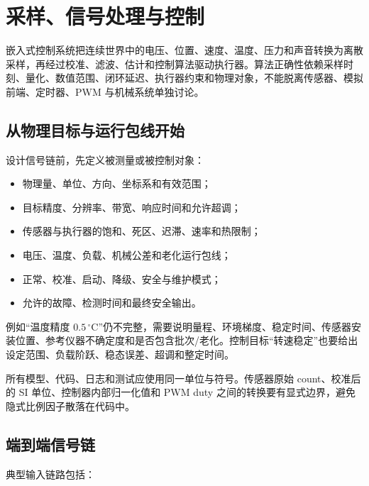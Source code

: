 \chapter{采样、信号处理与控制}
\label{chap:sampling-control-dsp}

嵌入式控制系统把连续世界中的电压、位置、速度、温度、压力和声音转换为离散采样，再经过校准、滤波、估计和控制算法驱动执行器。算法正确性依赖采样时刻、量化、数值范围、闭环延迟、执行器约束和物理对象，不能脱离传感器、模拟前端、定时器、PWM 与机械系统单独讨论。

\section{从物理目标与运行包线开始}

设计信号链前，先定义被测量或被控制对象：

\begin{itemize}
  \item 物理量、单位、方向、坐标系和有效范围；
  \item 目标精度、分辨率、带宽、响应时间和允许超调；
  \item 传感器与执行器的饱和、死区、迟滞、速率和热限制；
  \item 电压、温度、负载、机械公差和老化运行包线；
  \item 正常、校准、启动、降级、安全与维护模式；
  \item 允许的故障、检测时间和最终安全输出。
\end{itemize}

例如“温度精度 $0.5\,^{\circ}\mathrm{C}$”仍不完整，需要说明量程、环境梯度、稳定时间、传感器安装位置、参考仪器不确定度和是否包含批次/老化。控制目标“转速稳定”也要给出设定范围、负载阶跃、稳态误差、超调和整定时间。

所有模型、代码、日志和测试应使用同一单位与符号。传感器原始 count、校准后的 SI 单位、控制器内部归一化值和 PWM duty 之间的转换要有显式边界，避免隐式比例因子散落在代码中。

\section{端到端信号链}

典型输入链路包括：

\begin{center}
\end{center}


